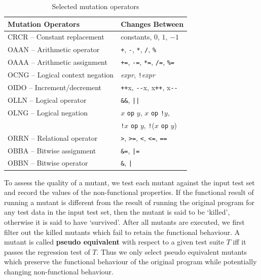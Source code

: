 \begin{table}[t]
\caption{Selected mutation operators}
\label{tab:cmop} 
\begin{center}
\begin{tabular}{ | l | l |}
  \hline
  Mutation Operators & Changes Between \\ 
\hline
 CRCR -- Constant replacement & constants, $0$, $1$, $-1$ \\
 OAAN -- Arithmetic operator & \texttt{+}, \texttt{-}, \texttt{*}, \texttt{/}, \texttt{\%} \\
 OAAA -- Arithmetic assignment & \texttt{+=}, \texttt{-=}, \texttt{*=}, \texttt{/=}, \texttt{\%=} \\
 OCNG -- Logical context negation & \textit{expr}, \texttt{!}\textit{expr} \\
 OIDO -- Increment/decrement & \texttt{++}x, \texttt{{-}-}x, x\texttt{++}, x\texttt{{-}-} \\
  OLLN -- Logical operator & \texttt{\&\&}, \texttt{||} \\ 
  OLNG -- Logical negation & $x$ \texttt{op} $y$, $x$ \texttt{op} \texttt{!}$y$,
  \\
  & \texttt{!}$x$ \texttt{op} $y$, \texttt{!}($x$ \texttt{op} $y$)\\
  ORRN -- Relational operator & \texttt{>}, \texttt{>=}, \texttt{<}, \texttt{<=}, \texttt{==} \\
  OBBA -- Bitwise assignment & \texttt{\&=}, \texttt{|=} \\
  OBBN -- Bitwise operator & \texttt{\&}, \texttt{|} \\
\hline
\end{tabular} 
\vspace*{-9mm}
\end{center} 
\end{table} 

To assess the quality of a mutant, we test each mutant against the input test set and record the values of the non-functional properties. If the functional result of running a mutant is different from the result of running the original program for any test data in the input test set, then the mutant is said to be `killed', otherwise it is said to have `survived'. 
After all mutants are executed, we first filter out the killed mutants
which fail to retain the functional behaviour. A mutant is called
\textbf{pseudo equivalent} with respect to a given test suite $T$ iff it
passes the regression test of $T$.  Thus we only select pseudo equivalent
mutants which preserve the functional behaviour of the original program
while potentially changing non-functional behaviour. 


